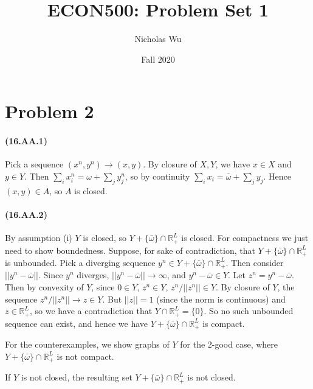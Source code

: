 \documentclass[10pt,letter]{article}
\begin{document}


\title{ECON500: Problem Set 1}

\author{Nicholas Wu}

\date{Fall 2020}

\maketitle


\section*{Problem 2}
\paragraph{(16.AA.1)}
Pick a sequence $(x^n, y^n) \to (x,y)$. By closure of $X, Y$, we have $x \in X$ and $y \in Y$. Then $\sum_i x_i^n = \omega + \sum_j y_j^n$, so by continuity $\sum_i x_i = \bar{\omega} + \sum_j y_j$. Hence $(x,y) \in A$, so $A$ is closed.
\paragraph{(16.AA.2)}
By assumption (i) $Y$ is closed, so $Y + \{ \bar{\omega} \} \cap \mathbb{R}^L_+ $ is closed. For compactness we just need to show boundedness. Suppose, for sake of contradiction, that $Y + \{ \bar{\omega} \} \cap \mathbb{R}^L_+ $ is unbounded. Pick a diverging sequence $y^n \in Y + \{ \bar{\omega} \} \cap \mathbb{R}^L_+ $. Then consider $||y^n - \bar{\omega}||$.
Since $y^n$ diverges, $||y^n - \bar{\omega}|| \to \infty$, and $y^n - \bar{\omega} \in Y$. Let $z^n = y^n - \bar{\omega}$. Then by convexity of $Y$, since $0 \in Y$, $z^n \in Y$, $z^n / ||z^n|| \in Y$. By closure of $Y$, the sequence $z^n / ||z^n|| \to z \in Y$. But $||z|| = 1$ (since the norm is continuous) and $z \in \mathbb{R}^L_+$, so we have a contradiction that $Y \cap \mathbb{R}^L_+ = \{ 0 \}$. So no such unbounded sequence can exist, and hence we have $Y + \{ \bar{\omega} \} \cap \mathbb{R}^L_+ $ is compact.

For the counterexamples, we show graphs of $Y$ for the 2-good case, where $Y + \{ \bar{\omega} \} \cap \mathbb{R}^L_+$ is not compact.

If $Y$ is not closed, the resulting set $Y + \{ \bar{\omega} \} \cap \mathbb{R}^L_+$ is not closed.
\end{document}
